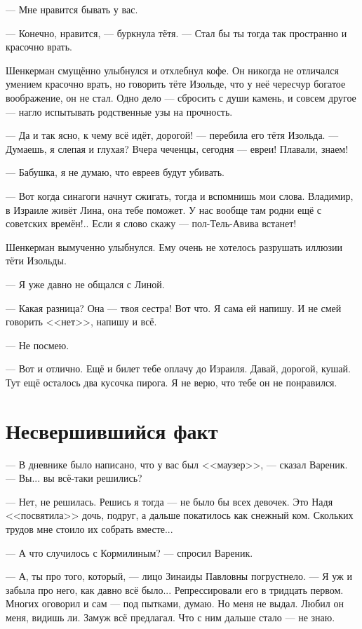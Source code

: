 \documentclass[a4paper,10pt,fleqn]{book}\usepackage{polyglossia}\setdefaultlanguage{english}\setotherlanguage{russian}\defaultfontfeatures{Ligatures=TeX,Mapping=tex-text} \usepackage{xcolor}\definecolor{lightgray}{HTML}{bbbbbb}\color{lightgray}\newcommand{\ml}[3]{\textcolor{black}{#3}}
\newcommand{\textspace}{\vspace{1em}{\centering\Large\bfseries<...>\par}\vspace{1em}}
\begin{document}
--- Мне нравится бывать у вас.

--- Конечно, нравится, --- буркнула тётя.
--- Стал бы ты тогда так пространно и красочно врать.

Шенкерман смущённо улыбнулся и отхлебнул кофе.
Он никогда не отличался умением красочно врать, но говорить тёте Изольде, что у неё чересчур богатое воображение, он не стал.
Одно дело --- сбросить с души камень, и совсем другое --- нагло испытывать родственные узы на прочность.

\textspace

--- Да и так ясно, к чему всё идёт, дорогой! --- перебила его тётя Изольда.
--- Думаешь, я слепая и глухая?
Вчера чеченцы, сегодня --- евреи!
Плавали, знаем!

--- Бабушка, я не думаю, что евреев будут убивать.

--- Вот когда синагоги начнут сжигать, тогда и вспомнишь мои слова.
Владимир, в Израиле живёт Лина, она тебе поможет.
У нас вообще там родни ещё с советских времён!..
Если я слово скажу --- пол-Тель-Авива встанет!

Шенкерман вымученно улыбнулся.
Ему очень не хотелось разрушать иллюзии тёти Изольды.

--- Я уже давно не общался с Линой.

--- Какая разница?
Она --- твоя сестра!
Вот что.
Я сама ей напишу.
И не смей говорить <<нет>>, напишу и всё.

--- Не посмею.

--- Вот и отлично.
Ещё и билет тебе оплачу до Израиля.
Давай, дорогой, кушай.
Тут ещё осталось два кусочка пирога.
Я не верю, что тебе он не понравился.

\section{Несвершившийся факт}

--- В дневнике было написано, что у вас был <<маузер>>, --- сказал Вареник.
--- Вы... вы всё-таки решились?

--- Нет, не решилась.
Решись я тогда --- не было бы всех девочек.
Это Надя <<посвятила>> дочь, подруг, а дальше покатилось как снежный ком.
Скольких трудов мне стоило их собрать вместе...

--- А что случилось с Кормилиным? --- спросил Вареник.

--- А, ты про того, который, --- лицо Зинаиды Павловны погрустнело.
--- Я уж и забыла про него, как давно всё было...
Репрессировали его в тридцать первом.
Многих оговорил и сам --- под пытками, думаю.
Но меня не выдал.
Любил он меня, видишь ли.
Замуж всё предлагал.
Что с ним дальше стало --- не знаю.
\end{document}
